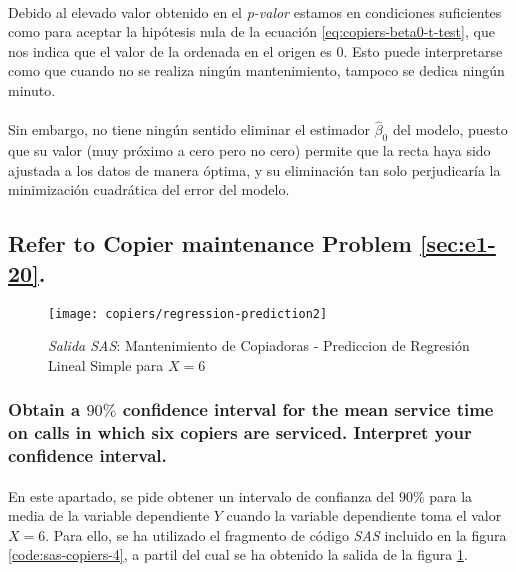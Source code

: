 \documentclass{article}
\begin{document}
        \paragraph{}
        Debido al elevado valor obtenido en el \emph{p-valor} estamos en condiciones suficientes como para aceptar la hipótesis nula de la ecuación \eqref{eq:copiers-beta0-t-test}, que nos indica que el valor de la ordenada en el origen es $0$. Esto puede interpretarse como que cuando no se realiza ningún mantenimiento, tampoco se dedica ningún minuto.

        \paragraph{}
        Sin embargo, no tiene ningún sentido eliminar el estimador $\widehat{\beta}_0$ del modelo, puesto que su valor (muy próximo a cero pero no cero) permite que la recta haya sido ajustada a los datos de manera óptima, y su eliminación tan solo perjudicaría la minimización cuadrática del error del modelo.

    \setcounter{subsection}{13}
    \subsection{Refer to \textbf{Copier maintenance} Problem \ref{sec:e1-20}.}

      \begin{figure}[!h]
        \centering
        \texttt{[image: copiers/regression-prediction2]}
        \caption{\emph{Salida SAS}: Mantenimiento de Copiadoras - Prediccion de Regresión Lineal Simple para $X = 6$}
        \label{img:copiers-regression-prediction2}
      \end{figure}

      \subsubsection{Obtain a $90\%$ confidence interval for the mean service time on calls in which six copiers are serviced. Interpret your confidence interval.}
      \label{sec:copiers-2.14a}

        \paragraph{}
        En este apartado, se pide obtener un intervalo de confianza del $90\%$ para la media de la variable dependiente $Y$ cuando la variable dependiente toma el valor $X=6$. Para ello, se ha utilizado el fragmento de código \emph{SAS} incluido en la figura \ref{code:sas-copiers-4}, a partil del cual se ha obtenido la salida de la figura \ref{img:copiers-regression-prediction2}.
\end{document}
